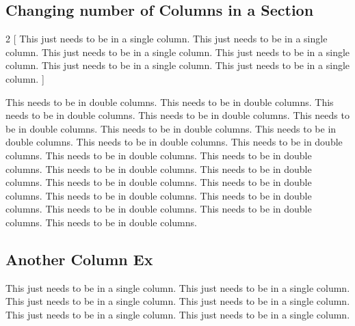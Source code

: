 \documentclass[12pt,twoside,a4paper]{article}
\begin{document}
\subsection*{Changing number of Columns in a Section}
\begin{multicols}{2}
  [
\newline This just needs to be in a single column. This just needs to be in a single column. This just needs to be in a single column. This just needs to be in a single column. This just needs to be in a single column. This just needs to be in a single column.
]

\newline This needs to be in double columns. This needs to be in double columns.
\newline This needs to be in double columns. This needs to be in double columns.
\newline This needs to be in double columns. This needs to be in double columns.
\newline This needs to be in double columns. This needs to be in double columns.
\newline This needs to be in double columns. This needs to be in double columns.
\newline This needs to be in double columns. This needs to be in double columns.
\newline This needs to be in double columns. This needs to be in double columns.
\newline This needs to be in double columns. This needs to be in double columns.
\newline This needs to be in double columns. This needs to be in double columns.
\newline This needs to be in double columns. This needs to be in double columns.
\end{multicols}

\subsection*{Another Column Ex}
\newline This just needs to be in a single column. This just needs to be in a single column. This just needs to be in a single column. This just needs to be in a single column. This just needs to be in a single column. This just needs to be in a single column.
\end{document}
